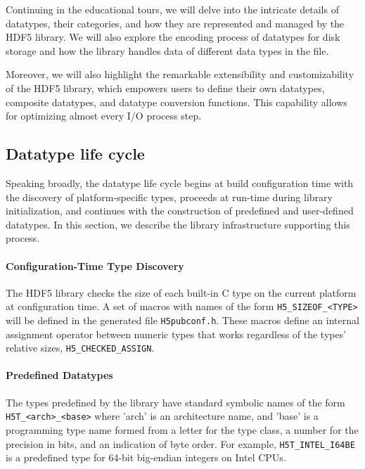 

Continuing in the educational tours, we will delve into the intricate details of datatypes, their categories, and how they are represented and managed by the HDF5 library. We will also explore the encoding process of datatypes for disk storage and how the library handles data of different data types in the file.

 Moreover, we will also highlight the remarkable extensibility and customizability of the HDF5 library, which empowers users to define their own datatypes, composite datatypes, and datatype conversion functions. This capability allows for optimizing almost every I/O process step.
\subsection{Datatype life cycle}

Speaking broadly, the datatype life cycle begins at build configuration time with the discovery of platform-specific types, proceeds at run-time during library initialization, and continues with the construction of predefined and user-defined datatypes. In this section, we describe the library infrastructure supporting this process.

\paragraph{Configuration-Time Type Discovery} The HDF5 library checks the size of each built-in C type on the current platform at configuration time. A set of macros with names of the form \texttt{H5\_SIZEOF\_<TYPE>} will be defined in the generated file \texttt{H5pubconf.h}. These macros define an internal assignment operator between numeric types that works regardless of the types' relative sizes, \texttt{H5\_CHECKED\_ASSIGN}.

\paragraph{Predefined Datatypes} The types predefined by the library have standard symbolic names of the form \texttt{H5T\_<arch>\_<base>} where 'arch' is an architecture name, and 'base' is a programming type name formed from a letter for the type class, a number for the precision in bits, and an indication of byte order. For example, \texttt{H5T\_INTEL\_I64BE} is a predefined type for 64-bit big-endian integers on Intel CPUs.

